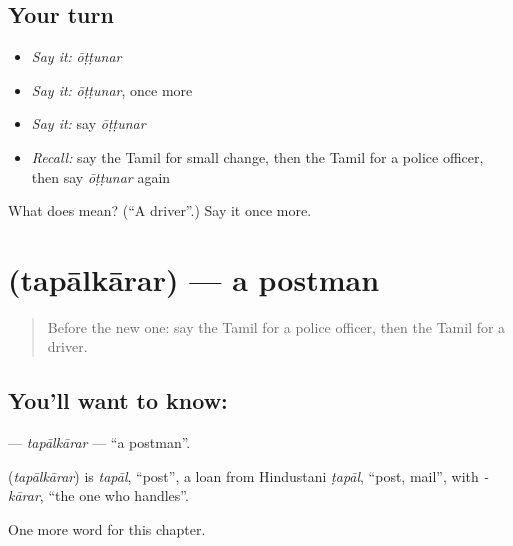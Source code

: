 \subsection*{Your turn}
\begin{itemize}
\raggedright
  \item \emph{Say it:} \emph{ōṭṭunar}
  \item \emph{Say it:} \emph{ōṭṭunar}, once more
  \item \emph{Say it:} say \emph{ōṭṭunar}
  \item \emph{Recall:} say the Tamil for small change, then the Tamil for a police officer, then say \emph{ōṭṭunar} again
\end{itemize}

\begin{tcolorbox}[breakable,colback=teal!4,colframe=teal!35!black,title={Before you move on}]
What does  mean? (\textquotedblleft{}A driver\textquotedblright{}.) Say it once more.
\end{tcolorbox}
\section[\texorpdfstring{\ta{தபால்காரர்} (tapālkārar)}{தபால்காரர் (tapālkārar)}]{ (tapālkārar) — a postman}

\label{lesson:TA-C192-tapalkarar}



\begin{quote}
Before the new one: say the Tamil for a police officer, then the Tamil for a driver.
\end{quote}

\subsection*{You'll want to know: }
\textbf{} — \emph{tapālkārar} — \textquotedblleft{}a postman\textquotedblright{}.

\begin{cousinweb}
\textbf{} (\emph{tapālkārar}) is \emph{tapāl}, \textquotedblleft{}post\textquotedblright{}, a loan from Hindustani \emph{ṭapāl}, \textquotedblleft{}post, mail\textquotedblright{}, with \emph{-kārar}, \textquotedblleft{}the one who handles\textquotedblright{}.
\end{cousinweb}

\begin{grammarlens}[title={What you've built}]
One more word for this chapter.
\end{grammarlens}


